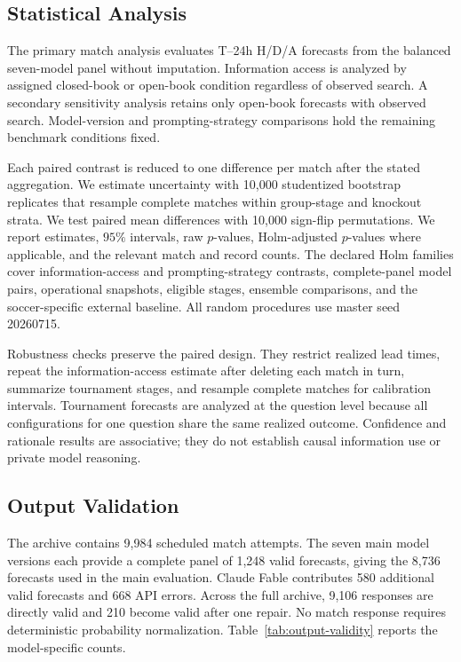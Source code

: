 \documentclass[sigconf,nonacm]{acmart}
\begin{document}
\subsection{Statistical Analysis}

The primary match analysis evaluates T--24h H/D/A forecasts from the balanced seven-model panel without imputation. Information access is analyzed by assigned closed-book or open-book condition regardless of observed search. A secondary sensitivity analysis retains only open-book forecasts with observed search. Model-version and prompting-strategy comparisons hold the remaining benchmark conditions fixed.

Each paired contrast is reduced to one difference per match after the stated aggregation. We estimate uncertainty with 10,000 studentized bootstrap replicates that resample complete matches within group-stage and knockout strata. We test paired mean differences with 10,000 sign-flip permutations. We report estimates, $95\%$ intervals, raw $p$-values, Holm-adjusted $p$-values where applicable, and the relevant match and record counts. The declared Holm families cover information-access and prompting-strategy contrasts, complete-panel model pairs, operational snapshots, eligible stages, ensemble comparisons, and the soccer-specific external baseline. All random procedures use master seed 20260715.

Robustness checks preserve the paired design. They restrict realized lead times, repeat the information-access estimate after deleting each match in turn, summarize tournament stages, and resample complete matches for calibration intervals. Tournament forecasts are analyzed at the question level because all configurations for one question share the same realized outcome. Confidence and rationale results are associative; they do not establish causal information use or private model reasoning.

\subsection{Output Validation}

The archive contains 9,984 scheduled match attempts. The seven main model versions each provide a complete panel of 1,248 valid forecasts, giving the 8,736 forecasts used in the main evaluation. Claude Fable contributes 580 additional valid forecasts and 668 API errors. Across the full archive, 9,106 responses are directly valid and 210 become valid after one repair. No match response requires deterministic probability normalization. Table~\ref{tab:output-validity} reports the model-specific counts.
\end{document}
